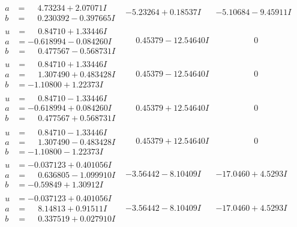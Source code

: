 \documentclass[1p]{elsarticle_modified}
\theoremstyle{definition}
\begin{document}
$$\begin{array}{c|c|c}
\begin{aligned}
a &= \phantom{-}4.73234 + 2.07071 I \\
b &= \phantom{-}0.230392 - 0.397665 I\end{aligned}
 & -5.23264 + 0.18537 I & -5.10684 - 9.45911 I \\ \hline\begin{aligned}
u &= \phantom{-}0.84710 + 1.33446 I \\
a &= -0.618994 - 0.084260 I \\
b &= \phantom{-}0.477567 - 0.568731 I\end{aligned}
 & \phantom{-}0.45379 - 12.54640 I & \phantom{-0.000000 } 0 \\ \hline\begin{aligned}
u &= \phantom{-}0.84710 + 1.33446 I \\
a &= \phantom{-}1.307490 + 0.483428 I \\
b &= -1.10800 + 1.22373 I\end{aligned}
 & \phantom{-}0.45379 - 12.54640 I & \phantom{-0.000000 } 0 \\ \hline\begin{aligned}
u &= \phantom{-}0.84710 - 1.33446 I \\
a &= -0.618994 + 0.084260 I \\
b &= \phantom{-}0.477567 + 0.568731 I\end{aligned}
 & \phantom{-}0.45379 + 12.54640 I & \phantom{-0.000000 } 0 \\ \hline\begin{aligned}
u &= \phantom{-}0.84710 - 1.33446 I \\
a &= \phantom{-}1.307490 - 0.483428 I \\
b &= -1.10800 - 1.22373 I\end{aligned}
 & \phantom{-}0.45379 + 12.54640 I & \phantom{-0.000000 } 0 \\ \hline\begin{aligned}
u &= -0.037123 + 0.401056 I \\
a &= \phantom{-}0.636805 - 1.099910 I \\
b &= -0.59849 + 1.30912 I\end{aligned}
 & -3.56442 - 8.10409 I & -17.0460 + 4.5293 I \\ \hline\begin{aligned}
u &= -0.037123 + 0.401056 I \\
a &= \phantom{-}8.14813 + 0.91511 I \\
b &= \phantom{-}0.337519 + 0.027910 I\end{aligned}
 & -3.56442 - 8.10409 I & -17.0460 + 4.5293 I \\ \hline\begin{aligned}

\end{aligned}
\end{array}$$
\end{document}
